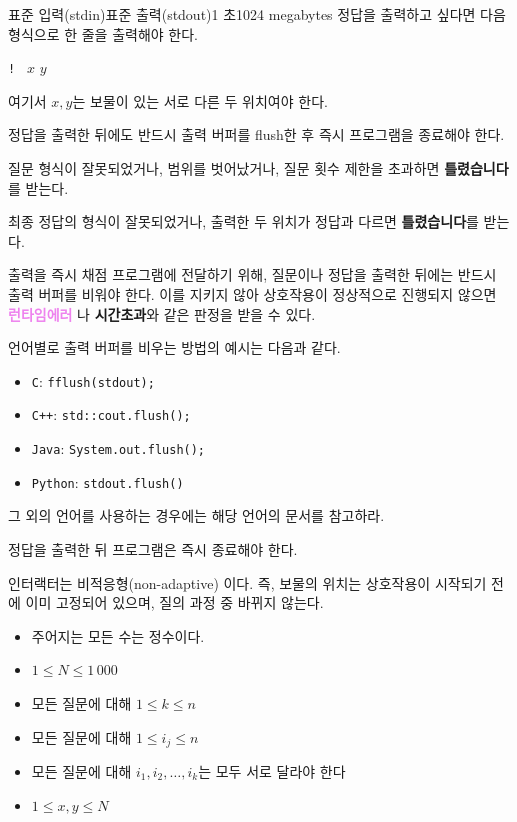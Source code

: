 \begin{problem}{\probtitle}{표준 입력(stdin)}{표준 출력(stdout)}{1 초}{1024 megabytes}
정답을 출력하고 싶다면 다음 형식으로 한 줄을 출력해야 한다.
\begin{center}
\texttt{! } $x$ $y$
\end{center}

여기서 $x, y$는 보물이 있는 서로 다른 두 위치여야 한다.

정답을 출력한 뒤에도 반드시 출력 버퍼를 flush한 후 즉시 프로그램을 종료해야 한다.

질문 형식이 잘못되었거나, 범위를 벗어났거나, 질문 횟수 제한을 초과하면 \textcolor{wared}{\textbf{틀렸습니다}}를 받는다.

최종 정답의 형식이 잘못되었거나, 출력한 두 위치가 정답과 다르면 \textcolor{wared}{\textbf{틀렸습니다}}를 받는다.

출력을 즉시 채점 프로그램에 전달하기 위해, 질문이나 정답을 출력한 뒤에는 반드시 출력 버퍼를 비워야 한다.
이를 지키지 않아 상호작용이 정상적으로 진행되지 않으면 \textcolor{violet}{\textbf{런타임에러}} 나 \textcolor{timeoutcolor}{\textbf{시간초과}}와 같은 판정을 받을 수 있다.

언어별로 출력 버퍼를 비우는 방법의 예시는 다음과 같다.

\begin{itemize}[topsep=0pt,noitemsep]
    \item \texttt{C}: \texttt{fflush(stdout);}
    \item \texttt{C++}: \texttt{std::cout.flush();}
    \item \texttt{Java}: \texttt{System.out.flush();}
    \item \texttt{Python}: \texttt{stdout.flush()}
\end{itemize}

그 외의 언어를 사용하는 경우에는 해당 언어의 문서를 참고하라.

정답을 출력한 뒤 프로그램은 즉시 종료해야 한다.

인터랙터는 비적응형(non-adaptive) 이다.
즉, 보물의 위치는 상호작용이 시작되기 전에 이미 고정되어 있으며, 질의 과정 중 바뀌지 않는다.

\Constraints

\begin{itemize}[topsep=0pt,noitemsep]
    \item 주어지는 모든 수는 정수이다.
    \item $1 \le N \le 1\,000$
    \item 모든 질문에 대해 $1 \le k \le n$
    \item 모든 질문에 대해 $1 \le i_j \le n$
    \item 모든 질문에 대해 $i_1, i_2, \dots, i_k$는 모두 서로 달라야 한다
    \item $1 \le x,y \le N$
\end{itemize}

\Example

\begin{example}
\end{example}



\end{problem}